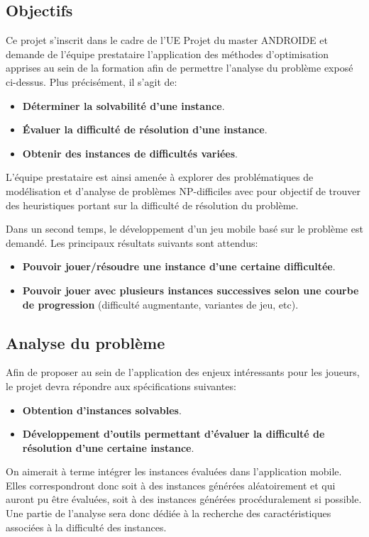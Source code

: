 \documentclass[a4paper, 11pt, titlepage]{article}
\begin{document}
\begin{appendix}
	\subsection{Objectifs}
	Ce projet s’inscrit dans le cadre de l’UE Projet du master ANDROIDE et demande de l’équipe prestataire l’application des méthodes d’optimisation apprises au sein de la formation afin de permettre l’analyse du problème exposé ci-dessus. Plus précisément, il s’agit de:
	\begin{itemize}
		\item \textbf{Déterminer la solvabilité d’une instance}.
		\item \textbf{Évaluer la difficulté de résolution d’une instance}.
		\item \textbf{Obtenir des instances de difficultés variées}.
	\end{itemize}
L’équipe prestataire est ainsi amenée à explorer des problématiques de modélisation et d’analyse de problèmes NP-difficiles avec pour objectif de trouver des heuristiques portant sur la difficulté de résolution du problème.

Dans un second temps, le développement d’un jeu mobile basé sur le problème est demandé. Les principaux résultats suivants sont attendus:
\begin{itemize}
	\item \textbf{Pouvoir jouer/résoudre une instance d’une certaine difficultée}.
	\item \textbf{Pouvoir jouer avec plusieurs instances successives selon une courbe de progression} (difficulté augmentante, variantes de jeu, etc).
\end{itemize}

\subsection{Analyse du problème}
Afin de proposer au sein de l’application des enjeux intéressants pour les joueurs, le projet devra répondre aux spécifications suivantes:
	\begin{itemize}
		\item \textbf{Obtention d’instances solvables}. 
		\item \textbf{Développement d’outils permettant d’évaluer la difficulté de résolution d’une certaine instance}. 
	\end{itemize}
On aimerait à terme intégrer les instances évaluées dans l’application mobile. Elles correspondront donc soit à des instances générées aléatoirement et qui auront pu être évaluées, soit à des instances générées procéduralement si possible. Une partie de l’analyse sera donc dédiée à la recherche des caractéristiques associées à la difficulté des instances.


\end{appendix}
\end{document}

